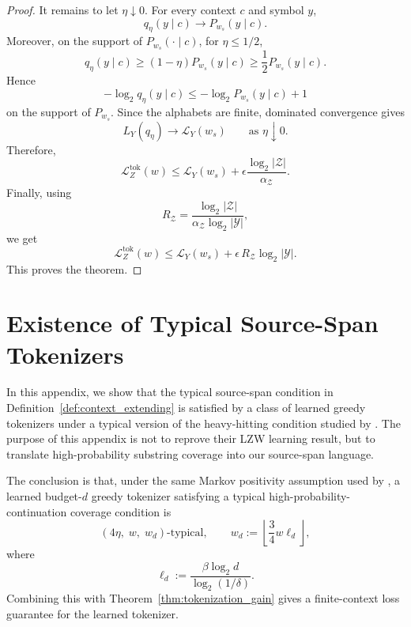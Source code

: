 \documentclass{article}
\theoremstyle{plain}
\theoremstyle{definition}
\theoremstyle{remark}
\begin{document}
\begin{proof}
    It remains to let $\eta\downarrow 0$. For every context $c$ and symbol $y$,
    \[
        q_\eta(y\mid c)
        \to
        P_{w_s}(y\mid c).
    \]
    Moreover, on the support of $P_{w_s}(\cdot\mid c)$, for $\eta\le 1/2$,
    \[
        q_\eta(y\mid c)
        \ge
        (1-\eta)P_{w_s}(y\mid c)
        \ge
        \frac12 P_{w_s}(y\mid c).
    \]
    Hence
    \[
        -\log_2 q_\eta(y\mid c)
        \le
        -\log_2 P_{w_s}(y\mid c)+1
    \]
    on the support of $P_{w_s}$. Since the alphabets are finite, dominated
    convergence gives
    \[
        L_Y(q_\eta)
        \to
        \mathcal L_Y(w_s)
        \qquad
        \text{as }\eta\downarrow 0.
    \]
    Therefore,
    \[
        \mathcal L_Z^{\mathrm{tok}}(w)
        \le
        \mathcal L_Y(w_s)
        +
        \epsilon\frac{\log_2|\mathcal Z|}{\alpha_{\mathcal Z}}.
    \]
    Finally, using
    \[
        R_{\mathcal Z}
        =
        \frac{\log_2|\mathcal Z|}
        {\alpha_{\mathcal Z}\log_2|\mathcal Y|},
    \]
    we get
    \[
        \mathcal L_Z^{\mathrm{tok}}(w)
        \le
        \mathcal L_Y(w_s)
        +
        \epsilon\,R_{\mathcal Z}\log_2|\mathcal Y|.
    \]
    This proves the theorem.
    \end{proof}
    
    \newpage
    \section{Existence of Typical Source-Span Tokenizers}
    \label{app:typical-heavy-hitting-tokenizers}
    
    In this appendix, we show that the typical source-span condition in
    Definition~\ref{def:context_extending} is satisfied by a class of learned
    greedy tokenizers under a typical version of the heavy-hitting condition studied
    by \citet{rajaramanAnalysisTokenizationTransformers2024}. The purpose of this
    appendix is not to reprove their LZW learning result, but to translate
    high-probability substring coverage into our source-span language.
    
    The conclusion is that, under the same Markov positivity assumption used by
    \citet{rajaramanAnalysisTokenizationTransformers2024}, a learned
    budget-$d$ greedy tokenizer satisfying a typical high-probability-continuation
    coverage condition is
    \[
        \left(4\eta,\; w,\; w_d\right)\text{-typical},
        \qquad
        w_d
        :=
        \left\lfloor \frac{3}{4}w\ell_d \right\rfloor,
    \]
    where
    \[
        \ell_d
        :=
        \frac{\beta\log_2 d}{\log_2(1/\delta)}.
    \]
    Combining this with Theorem~\ref{thm:tokenization_gain} gives a finite-context
    loss guarantee for the learned tokenizer.
    
\end{document}

